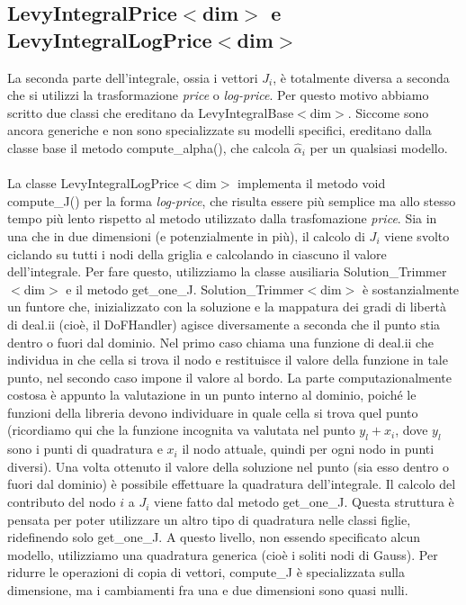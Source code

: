 \documentclass[a4paper,10pt]{report}
\theoremstyle{plain}
\theoremstyle{definition}
\theoremstyle{remark}
\begin{document}
\subsection{\textsf{LevyIntegralPrice$<$dim$>$} e \textsf{LevyIntegralLogPrice$<$dim$>$}}
La seconda parte dell'integrale, ossia i vettori $J_i$, è totalmente diversa a seconda che si utilizzi la trasformazione \emph{price} o \emph{log-price}. Per questo motivo abbiamo scritto due classi che ereditano da \textsf{LevyIntegralBase$<$dim$>$}. Siccome sono ancora generiche e non sono specializzate su modelli specifici, ereditano dalla classe base il metodo \textsf{compute\_alpha()}, che calcola $\hat{\alpha}_i$ per un qualsiasi modello.\\\\La classe \textsf{LevyIntegralLogPrice$<$dim$>$} implementa il metodo \textsf{void compute\_J()} per la forma \emph{log-price}, che risulta essere pi\`u semplice ma allo stesso tempo più lento rispetto al metodo utilizzato dalla trasfomazione \emph{price}. Sia in una che in due dimensioni (e potenzialmente in più), il calcolo di $J_i$ viene svolto ciclando su tutti i nodi della griglia e calcolando in ciascuno il valore dell'integrale. Per fare questo, utilizziamo la classe ausiliaria \textsf{Solution\_Trimmer$<$dim$>$} e il metodo \textsf{get\_one\_J}. \textsf{Solution\_Trimmer$<$dim$>$} è sostanzialmente un funtore che, inizializzato con la soluzione e la mappatura dei gradi di libertà di \textsf{deal.ii} (cio\`e, il \textsf{DoFHandler}) agisce diversamente a seconda che il punto stia dentro o fuori dal dominio. Nel primo caso chiama una funzione di \textsf{deal.ii} che individua in che cella si trova il nodo e restituisce il valore della funzione in tale punto, nel secondo caso impone il valore al bordo. La parte computazionalmente costosa è appunto la valutazione in un punto interno al dominio, poiché le funzioni della libreria devono individuare in quale cella si trova quel punto (ricordiamo qui che la funzione incognita va valutata nel punto $y_l+x_i$, dove $y_l$ sono i punti di quadratura e $x_i$ il nodo attuale, quindi per ogni nodo in punti diversi). Una volta ottenuto il valore della soluzione nel punto (sia esso dentro o fuori dal dominio) è possibile effettuare la quadratura dell'integrale. Il calcolo del contributo del nodo $i$ a $J_i$ viene fatto dal metodo \textsf{get\_one\_J}. Questa struttura è pensata per poter utilizzare un altro tipo di quadratura nelle classi figlie, ridefinendo solo \textsf{get\_one\_J}. A questo livello, non essendo specificato alcun modello, utilizziamo una quadratura generica (cio\`e i soliti nodi di Gauss). Per ridurre le operazioni di copia di vettori, \textsf{compute\_J} è specializzata sulla dimensione, ma i cambiamenti fra una e due dimensioni sono quasi nulli.
\end{document}
